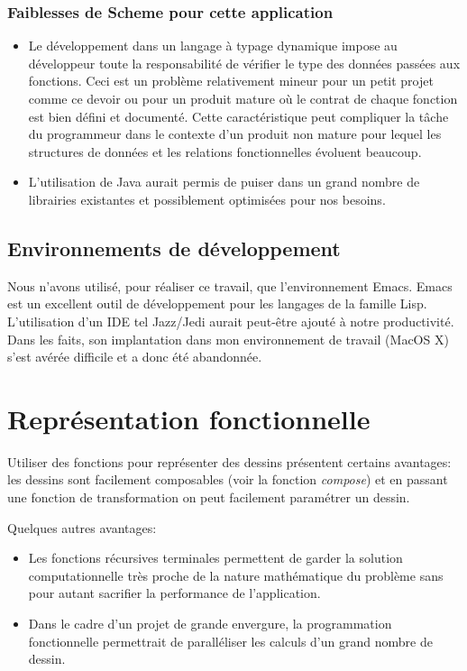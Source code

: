 \documentclass[10pt]{article}
\begin{document}
\subsubsection{Faiblesses de Scheme pour cette application}
\begin{itemize}
\item Le développement dans un langage à typage dynamique impose au
  développeur toute la responsabilité de vérifier le type des données
  passées aux fonctions. Ceci est un problème relativement mineur pour
  un petit projet comme ce devoir ou pour un produit mature où le
  contrat de chaque fonction est bien défini et documenté. Cette
  caractéristique peut compliquer la tâche du programmeur dans le
  contexte d'un produit non mature pour lequel les structures de
  données et les relations fonctionnelles évoluent beaucoup.
\item L'utilisation de Java aurait permis de puiser dans un grand
  nombre de librairies existantes et possiblement optimisées pour nos
  besoins.

\end{itemize}

\subsection{Environnements de développement}
Nous n'avons utilisé, pour réaliser ce travail, que l'environnement
Emacs. Emacs est un excellent outil de développement pour les langages
de la famille Lisp. L'utilisation d'un IDE tel Jazz/Jedi aurait
peut-être ajouté à notre productivité. Dans les faits, son
implantation dans mon environnement de travail (MacOS X) s'est avérée
difficile et a donc été abandonnée.


\section{Représentation fonctionnelle}

Utiliser des fonctions pour représenter des dessins présentent
certains avantages: les dessins sont facilement composables (voir la
fonction \emph{compose}) et en passant une fonction de transformation
on peut facilement paramétrer un dessin.

Quelques autres avantages:

\begin{itemize}
\item Les fonctions récursives terminales permettent de garder la
  solution computationnelle très proche de la nature mathématique du
  problème sans pour autant sacrifier la performance de l'application.
\item Dans le cadre d'un projet de grande envergure, la programmation
  fonctionnelle permettrait de paralléliser les calculs d'un grand
  nombre de dessin.
\end{itemize}
\end{document}
